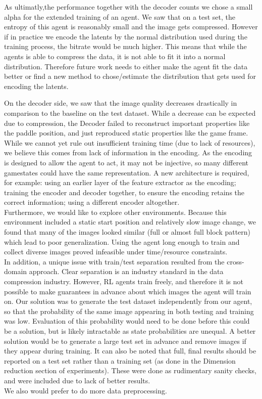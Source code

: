 As ultimatly,the performance together with the decoder counts we chose a small
alpha for the extended training of an agent. We saw that on a test set, the
entropy of this agent is reasonably small and the image gets compressed. However
if in practice we encode the latents by the normal distribution used during the
training process, the bitrate would be much higher. This means that while
the agents is able to compress the data, it is not able to fit it into a normal
distribution. Therefore future work needs to either make the agent fit the data
better or find a new method to chose/estimate the distribution that gets used
for encoding the latents. 

On the decoder side, we saw that the image quality decreases drastically in
comparison to the baseline on the test dataset. While a decrease can be expected
due to compression, the Decoder failed to reconstruct important properties like
the paddle position, and just reproduced static properties like the game frame.
While we cannot yet rule out insufficient training time (due to lack of
resources), we believe this comes from lack of information in the encoding. As
the encoding is designed to allow the agent to act, it may not be injective, so
many different gamestates could have the same representation. A new architecture
is required, for example: using an earlier layer of the feature extractor as the
encoding; training the encoder and decoder together, to ensure the encoding
retains the correct information; using a different encoder altogether.\\


Furthermore, we would like to explore other environments. Because this
environment included a static start position and relatively slow image change,
we found that many of the images looked similar (full or almost full block
pattern) which lead to poor generalization. Using the agent long enough to train
and collect diverse images proved infeasible under time/resource constraints.\\
In addition, a unique issue with train/test separation resulted from the
cross-domain approach. Clear separation is an industry standard in the data
compression industry. However, RL agents train freely, and therefore it is not
possible to make guarantees in advance about which images the agent will train
on. Our solution was to generate the test dataset independently from our agent,
so that the probability of the same image appearing in both testing and training
was low. Evaluation of this probability would need to be done before this could
be a solution, but is likely intractable as state probabilities are unequal. A
better solution would be to generate a large test set in advance and remove
images if they appear during training. It can also be noted that full, final
results should be reported on a test set rather than a training set (as done in
the Dimension reduction section of experiments). These were done as rudimentary
sanity checks, and were included due to lack of better results.\\
We also would prefer to do more data preprocessing.
